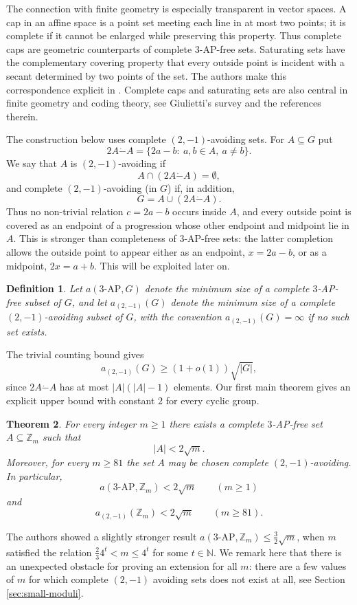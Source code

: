 \documentclass[11pt]{article}
\newtheorem{theorem}{Theorem}[section]
\newtheorem{definition}[theorem]{Definition}
\newcommand{\Z}{\mathbb Z}
\newcommand{\F}{\mathbb F}
\newcommand{\dotminus}{\mathbin{\dot{-}}}
\newcommand{\AP}{\mathrm{AP}}
\newcommand{\aavo}{a_{(2,-1)}}
\begin{document}
	The connection with finite geometry is especially transparent in vector spaces.  A cap in an affine space is a point set meeting each line in at most two points; it is complete if it cannot be enlarged while preserving this property.  Thus complete caps are geometric counterparts of complete $3$-AP-free sets.  Saturating sets have the complementary covering property that every outside point is incident with a secant determined by two points of the set.  The authors make this correspondence explicit in \cite[Proposition~2.10]{CsajbokNagy2025}.  Complete caps and saturating sets are also central in finite geometry and coding theory, see Giulietti's survey \cite{Giulietti2013} and the references therein.  %
	
	The construction below uses  complete $(2,-1)$-avoiding sets.  For $A\subseteq G$ put
	\[
	2A\dotminus A=\{2a-b:\ a,b\in A,\ a\ne b\}.
	\]
	We say that $A$ is $(2,-1)$-avoiding  if
	\[
	A\cap(2A\dotminus A)=\emptyset,
	\]
	and complete $(2,-1)$-avoiding (in $G$) if, in addition,
	\[
	G=A\cup(2A\dotminus A).
	\]
	Thus no non-trivial relation $c=2a-b$ occurs inside $A$, and every outside point is covered as an endpoint of a progression whose other endpoint and midpoint lie in $A$.  This is stronger than completeness of $3$-AP-free sets:  the latter completion allows the outside point to appear either as an endpoint, $x=2a-b$, or as a midpoint, $2x=a+b$.  This will be exploited later on.%
	
	\begin{definition}
		Let $a(3\text{-}\AP,G)$ denote the minimum size of a complete $3$-AP-free subset of $G$, and let $\aavo(G)$ denote the minimum size of a complete $(2,-1)$-avoiding subset of $G$, with the convention $\aavo(G)=\infty$ if no such set exists.     
	\end{definition}
	The trivial counting bound gives
	\[
	\aavo(G)\ge (1+o(1))\sqrt{|G|},
	\]
	since $2A\dotminus A$ has at most $|A|(|A|-1)$ elements.  Our first main theorem gives an explicit upper bound with constant $2$ for every cyclic group.
	
	\begin{theorem}
		\label{thm:main}
		For every integer $m\ge1$ there exists a complete $3$-AP-free set $A\subseteq\Z_m$ such that
		\[
		|A|< 2\sqrt m .
		\]
		Moreover, for every $m\ge81$ the set $A$ may be chosen complete $(2,-1)$-avoiding.  In particular,
		\[
		a(3\text{-}\AP,\Z_m)< 2\sqrt m
		\qquad (m\ge1)
		\]
		and
		\[
		\aavo(\Z_m)<2\sqrt m
		\qquad (m\ge81).
		\]
	\end{theorem}
	The authors \cite{CsajbokNagy2025} showed a slightly stronger result 
	$a(3\text{-}\AP,\Z_m)\le \frac32\sqrt m$, when $m$ satisfied the relation $\frac{2}{3}4^t<m\le4^t$ for some $t \in \mathbb{N}$. 
	We remark here that there is an unexpected obstacle for proving an extension for all $m$: there are a few values of $m$ for which complete $(2, -1)$ avoiding sets does not exist at all, see Section \ref{sec:small-moduli}.
	
\end{document}
